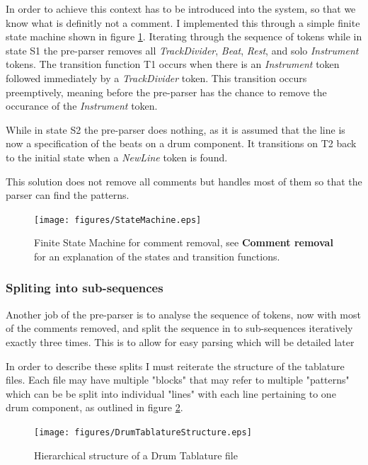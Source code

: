 \documentclass[12pt,twoside,notitlepage]{report}
\begin{document}
			In order to achieve this context has to be introduced into the system, so that we know what is definitly not a comment. I implemented this through a simple finite state machine shown in figure \ref{fsaf}. Iterating through the sequence of tokens while in state S1 the pre-parser removes all \emph{TrackDivider}, \emph{Beat}, \emph{Rest}, and solo \emph{Instrument} tokens. The transition function T1 occurs when there is an \emph{Instrument} token followed immediately by a \emph{TrackDivider} token. This transition occurs preemptively, meaning before the pre-parser has the chance to remove the occurance of the \emph{Instrument} token.
			
			While in state S2 the pre-parser does nothing, as it is assumed that the line is now a specification of the beats on a drum component. It transitions on T2 back to the initial state when a \emph{NewLine} token is found.
			
			This solution does not remove all comments but handles most of them so that the parser can find the patterns.
			\begin{figure}
			
				 
			\centerline{\texttt{[image: figures/StateMachine.eps]}} 
            \caption{\label{fsaf} Finite State Machine for comment removal, see \textbf{Comment removal} for an explanation of the states and transition functions.}                         
            \end{figure}
            
            \subsubsection{Spliting into sub-sequences}
            Another job of the pre-parser is to analyse the sequence of tokens, now with most of the comments removed, and split the sequence in to sub-sequences iteratively exactly three times. This is to allow for easy parsing which will be detailed later
            
            In order to describe these splits I must reiterate the structure of the tablature files. Each file may have multiple "blocks" that may refer to multiple "patterns" which can be be split into individual "lines" with each line pertaining to one drum component, as outlined in figure \ref{fig:tabStruct}.
           
            
            \begin{figure}[h]
			\centerline{\texttt{[image: figures/DrumTablatureStructure.eps]}}
			\caption{\label{fig:tabStruct} Hierarchical structure of a Drum Tablature file }
\end{figure}
\end{document}
